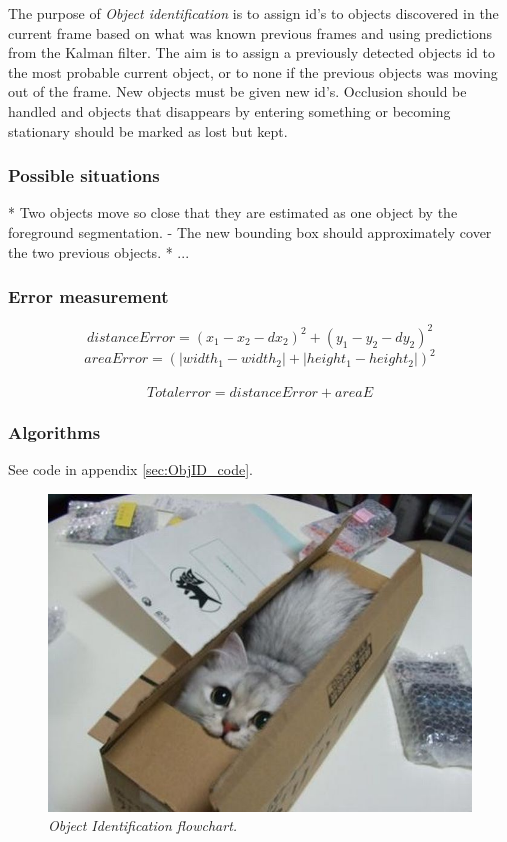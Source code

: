 The purpose of \emph{Object identification} is to assign id's to objects discovered in the current frame based on what was known previous frames and using predictions from the Kalman filter. The aim is to assign a previously detected objects id to the most probable current object, or to none if the previous objects was moving out of the frame. New objects must be given new id's. Occlusion should be handled and objects that disappears by entering something or becoming stationary should be marked as lost but kept.

\subsubsection{Possible situations}
* Two objects move so close that they are estimated as one object by the foreground segmentation.
   - The new bounding box should approximately cover the two previous objects.
* ...

\subsubsection{Error measurement}
$$
  distanceError = (x_1 - x_2 - dx_2)^2 + (y_1 - y_2 - dy_2)^2
$$
$$
  areaError = (|width_1 - width_2| + |height_1 - height_2|)^2
$$
\\
$$
  Total error = distanceError + areaE
$$


\subsubsection{Algorithms}
See code in appendix \ref{sec:ObjID_code}. %

\begin{figure}[htb]
	\centering
	\includegraphics[width=\linewidth]{images/acatisfinetoo}
	\caption{\textit{Object Identification flowchart.}}
	\label{fig:ObjID_fig} %
\end{figure}
